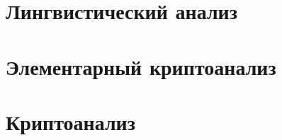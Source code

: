 \documentclass[unicode,12pt,a4paper,oneside,fleqn]{article}
\begin{document}
    
    
    \section{Лингвистический анализ}
    
    
    
    \pagebreak

    \section{Элементарный криптоанализ}
    
    
    
    \pagebreak

    \section{Криптоанализ}
    
    
    \pagebreak

    
    
\end{document}
